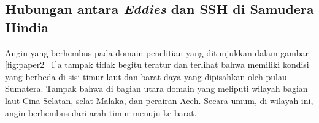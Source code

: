 \begin{spacing}{1.5}
	\begin{table}[H]
		\centering
		\caption{Analisis variansi (ANOVA)}
		\label{table:paper1_3}
	\end{table}
	
\subsection[Hubungan antara \textit{Eddies} dan SSH di Samudera Hindia]{Hubungan antara \textit{Eddies} dan SSH di Samudera Hindia}
	
	Angin yang berhembus pada domain penelitian yang ditunjukkan dalam gambar \ref{fig:paper2_1}a tampak tidak begitu teratur dan terlihat bahwa memiliki kondisi yang berbeda di sisi timur laut dan barat daya yang dipisahkan oleh pulau Sumatera. Tampak bahwa di bagian utara domain yang meliputi wilayah bagian laut Cina Selatan, selat Malaka, dan perairan Aceh. Secara umum, di wilayah ini, angin berhembus dari arah timur menuju ke barat. 
	

\end{spacing}
